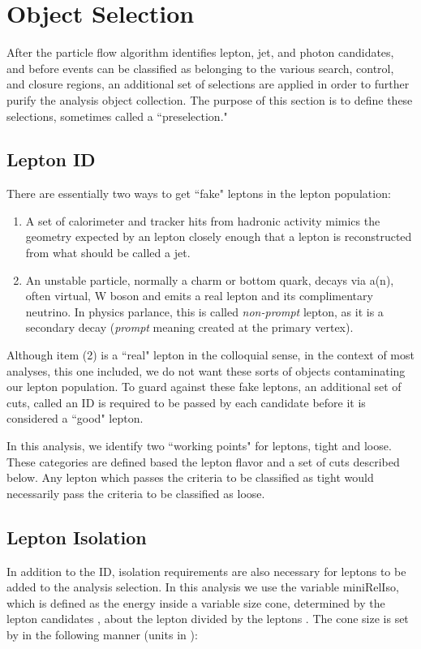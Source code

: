 \section{Object Selection}

  After the particle flow algorithm identifies lepton, jet, and photon candidates, and before events can be classified as belonging to the various search, control, and closure regions, an additional set of selections are applied in order to further purify the analysis object collection. The purpose of this section is to define these selections, sometimes called a ``preselection."

  \subsection{Lepton ID}
    There are essentially two ways to get ``fake" leptons in the lepton population:

    \begin{enumerate}
      \item A set of calorimeter and tracker hits from hadronic activity mimics the geometry expected by an lepton closely enough that a lepton is reconstructed from what should be called a jet.
      \item An unstable particle, normally a charm or bottom quark, decays via a(n), often virtual, W boson and emits a real lepton and its complimentary neutrino. In physics parlance, this is called \emph{non-prompt} lepton, as it is a secondary decay (\emph{prompt} meaning created at the primary vertex).
    \end{enumerate}

    Although item (2) is a ``real" lepton in the colloquial sense, in the context of most analyses, this one included, we do not want these sorts of objects contaminating our lepton population. To guard against these fake leptons, an additional set of cuts, called an ID is required to be passed by each candidate before it is considered a ``good" lepton.

    In this analysis, we identify two ``working points" for leptons, tight and loose. These categories are defined based the lepton flavor and a set of cuts described below. Any lepton which passes the criteria to be classified as tight would necessarily pass the criteria to be classified as loose.

  \subsection{Lepton Isolation}
    In addition to the ID, isolation requirements are also necessary for leptons to be added to the analysis selection. In this analysis we use the variable miniRelIso, which is defined as the energy inside a variable size cone, determined by the lepton candidates \pt, about the lepton divided by the leptons \pt. The cone size is set by \pt in the following manner (units in \GeV):

